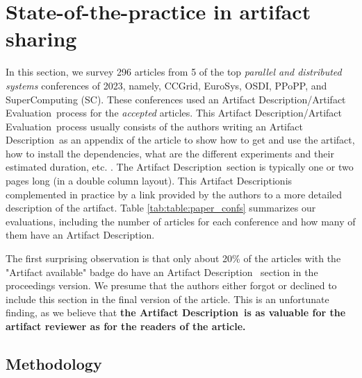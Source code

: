 \documentclass[sigconf,natbib=false]{acmart}
\newcommand{\ad}{Artifact Description}
\newcommand{\aeval}{Artifact Evaluation}
\newcommand{\adae}{\ad/\aeval}
\newcommand{\todo}[1]{{\color{red}{TODO: #1}}}
\begin{document}
%
\section{State-of-the-practice in artifact sharing}\label{sec:sop}



In this section, we survey 296 articles from 5 of the top \emph{parallel and distributed systems} conferences of 2023, namely, CCGrid, EuroSys, OSDI, PPoPP, and SuperComputing (SC).
These conferences used an \adae\ process for the \emph{accepted} articles.
This \adae\ process usually consists of the authors writing an \ad\ as an appendix of the article to show how to get and use the artifact, how to install the dependencies, what are the different experiments and their estimated duration, etc. \cite{ae_tip, creating_successful_artifacts, ae_guidelines}.
The \ad\ section is typically one or two pages long (in a double column layout).
This \ad is complemented in practice by a link provided by the authors to a more detailed description of the artifact.
Table \ref{tab:table:paper_confs} summarizes our evaluations, including the number of articles for each conference and how many of them have an \ad.


The first surprising observation is that only about 20\% of the articles with the "Artifact available" badge do have an \ad~ section in the proceedings version.
We presume that the authors either forgot or declined to include this section in the final version of the article.
This is an unfortunate finding, as we believe that \textbf{the \ad\ is as valuable for the artifact reviewer as for the readers of the article.}

\subsection{Methodology}
\end{document}
